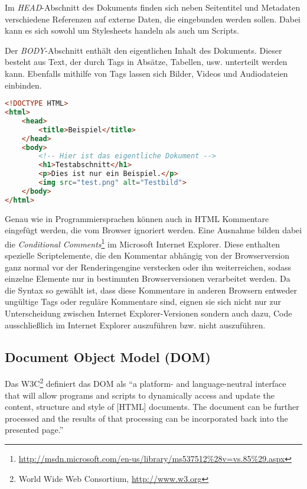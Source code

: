 Im \emph{HEAD}-Abschnitt des Dokuments finden sich neben Seitentitel und Metadaten verschiedene
Referenzen auf externe Daten, die eingebunden werden sollen. Dabei kann es sich sowohl um
Stylesheets handeln als auch um Scripts.

Der \emph{BODY}-Abschnitt enthält den eigentlichen Inhalt des Dokuments. Dieser besteht aus Text,
der durch Tags in Absätze, Tabellen, usw. unterteilt werden kann. Ebenfalls mithilfe von Tags lassen
sich Bilder, Videos und Audiodateien einbinden.

\begin{lstlisting}[language=HTML,caption=Ein HTML5-Dokument]
<!DOCTYPE HTML>
<html>
    <head>
        <title>Beispiel</title>
    </head>
    <body>
        <!-- Hier ist das eigentliche Dokument -->
        <h1>Testabschnitt</h1>
        <p>Dies ist nur ein Beispiel.</p>
        <img src="test.png" alt="Testbild">
    </body>
</html>
\end{lstlisting}

Genau wie in Programmiersprachen können auch in HTML Kommentare eingefügt werden, die vom Browser
ignoriert werden. Eine Ausnahme bilden dabei die \emph{Conditional
Comments}\footnote{\href{http://msdn.microsoft.com/en-us/library/ms537512\%28v=vs.85\%29.aspx}{http://msdn.microsoft.com/en-us/library/ms537512\%28v=vs.85\%29.aspx}}
im Microsoft Internet Explorer. Diese enthalten spezielle Scriptelemente, die den Kommentar abhängig
von der Browserversion ganz normal vor der Renderingengine verstecken oder ihn weiterreichen, sodass
einzelne Elemente nur in bestimmten Browserversionen verarbeitet werden. Da die Syntax so gewählt
ist, dass diese Kommentare in anderen Browsern entweder ungültige Tags oder reguläre Kommentare
sind, eignen sie sich nicht nur zur Unterscheidung zwischen Internet Explorer-Versionen sondern auch
dazu, Code ausschließlich im Internet Explorer auszuführen bzw. nicht auszuführen.


\subsection{Document Object Model (DOM)}
Das W3C\footnote{World Wide Web Consortium, \href{http://www.w3.org}{http://www.w3.org}} definiert
das DOM als \enquote{a platform- and language-neutral interface that will allow programs and scripts
to dynamically access and update the content, structure and style of [HTML] documents. The document
can be further processed and the results of that processing can be incorporated back into the
presented page.} \citep{w3c:dom-old}


